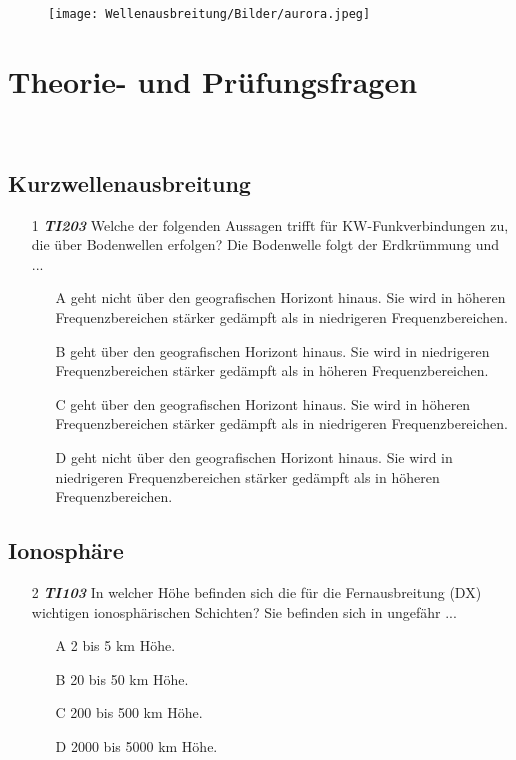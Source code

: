 \begin{wrapfigure}[2]{r}[-1cm]{4cm}
 \vspace{-6cm}
  \texttt{[image: Wellenausbreitung/Bilder/aurora.jpeg]}
 \vspace{-6cm}
\end{wrapfigure}

\section{Theorie- und Prüfungsfragen}

~~~~~~
\subsection*{Kurzwellenausbreitung}

\begin{enumerate} 
\itemsep1pt\parskip0pt
\item[1] \emph{\textbf{TI203}}  Welche der folgenden Aussagen trifft für KW-Funkverbindungen zu, die über Bodenwellen erfolgen? Die Bodenwelle folgt der Erdkrümmung und ...
	\begin{enumerate}
	\itemsep1pt\parskip0pt
		\item[A] geht nicht über den geografischen Horizont hinaus. Sie wird in höheren Frequenzbereichen stärker gedämpft als in niedrigeren Frequenzbereichen.
		\item[B] geht über den geografischen Horizont hinaus. Sie wird in niedrigeren Frequenzbereichen stärker gedämpft als in höheren Frequenzbereichen.
		\item[C] geht über den geografischen Horizont hinaus. Sie wird in höheren Frequenzbereichen stärker gedämpft als in niedrigeren Frequenzbereichen.
		\item[D] geht nicht über den geografischen Horizont hinaus. Sie wird in niedrigeren Frequenzbereichen stärker gedämpft als in höheren Frequenzbereichen.
	\end{enumerate}
\end{enumerate}

\subsection*{Ionosphäre}

\begin{enumerate} 
\itemsep1pt\parskip0pt
\item[2] \emph{\textbf{TI103}}  In welcher Höhe befinden sich die für die Fernausbreitung (DX) wichtigen ionosphärischen Schichten? Sie befinden sich in ungefähr ...
	\begin{enumerate}
	\itemsep1pt\parskip0pt
		\item[A] 2 bis 5 km Höhe.
		\item[B] 20 bis 50 km Höhe.
		\item[C] 200 bis 500 km Höhe.
		\item[D] 2000 bis 5000 km Höhe.
	\end{enumerate}
\end{enumerate}

